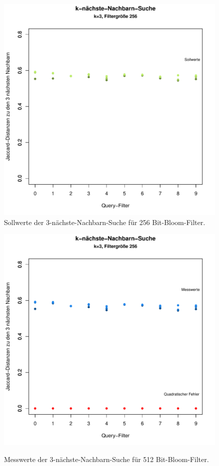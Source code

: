 \begin{figure}
	\centering
	\includegraphics[scale=0.7]{pictures/nn3_256-1.pdf}\\
	\caption[Sollwerte der 3-nächste-Nachbarn-Suche für 256 Bit-Bloom-Filter]{Sollwerte der 3-nächste-Nachbarn-Suche für 256 Bit-Bloom-Filter.}\label{fig:pic9}
	\includegraphics[scale=0.7]{pictures/nn3_256-2.pdf}\\
	\caption[Messwerte der 3-nächste-Nachbarn-Suche für 512 Bit-Bloom-Filter]{Messwerte der 3-nächste-Nachbarn-Suche für 512 Bit-Bloom-Filter.}\label{fig:pic10}
\end{figure}
